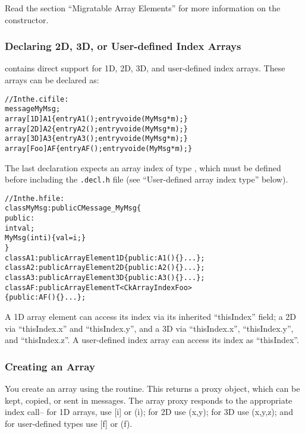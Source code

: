 Read the section ``Migratable Array Elements'' for more
information on the  constructor. 


\subsubsection{Declaring 2D, 3D, or User-defined Index Arrays}

\charmpp{} contains direct support for 1D, 2D, 3D, and user-defined
index arrays.  These arrays can be declared as:

\begin{alltt}
//In the .ci file:
message MyMsg;
array [1D] A1 \{ entry A1(); entry void e(MyMsg *m);\}
array [2D] A2 \{ entry A2(); entry void e(MyMsg *m);\}
array [3D] A3 \{ entry A3(); entry void e(MyMsg *m);\}
array [Foo] AF \{ entry AF(); entry void e(MyMsg *m);\}
\end{alltt}

The last declaration expects an array index of type ,
which must be defined before including the \texttt{.decl.h} file 
(see ``User-defined array index type'' below).  

\begin{alltt}
//In the .h file:
class MyMsg: public CMessage_MyMsg \{
public: 
  int val;
  MyMsg(int i) \{val=i;\}
\}
class A1:public ArrayElement1D \{ public: A1()\{\} ...\};
class A2:public ArrayElement2D \{ public: A2()\{\} ...\};
class A3:public ArrayElement3D \{ public: A3()\{\} ...\};
class AF:public ArrayElementT<CkArrayIndexFoo> 
  \{ public: AF()\{\} ...\};
\end{alltt}

A 1D array element can access its index via its inherited ``thisIndex''
field; a 2D via ``thisIndex.x'' and ``thisIndex.y'', and a 3D via
``thisIndex.x'', ``thisIndex.y'', and ``thisIndex.z''.  A user-defined
index array can access its index as ``thisIndex''.


\subsubsection{Creating an Array}

You create an array using the 
routine.  This returns a proxy object, which can
be kept, copied, or sent in messages.
The array proxy responds to the appropriate index call--
for 1D arrays, use [i] or (i); for 2D use (x,y); for 3D
use (x,y,z); and for user-defined types use [f] or (f).

